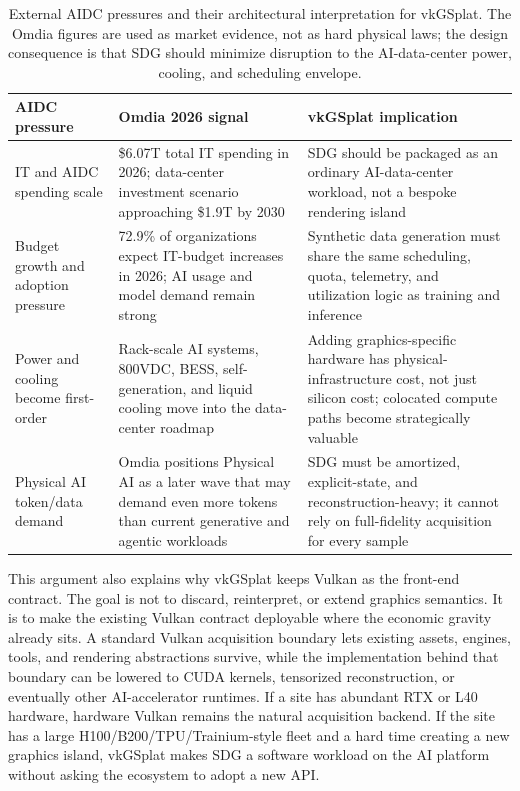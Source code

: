\documentclass[10pt,journal,onecolumn]{IEEEtran}
\begin{document}
\begin{table}[t]
\centering
\small
\caption{External AIDC pressures and their architectural interpretation for
vkGSplat. The Omdia figures are used as market evidence, not as hard physical
laws; the design consequence is that SDG should minimize disruption to the
AI-data-center power, cooling, and scheduling envelope.}
\label{tab:omdia-aidc-pressures}
\begin{tabular}{p{}p{}p{}}
\toprule
\textbf{AIDC pressure} & \textbf{Omdia 2026 signal} & \textbf{vkGSplat implication} \\
\midrule
IT and AIDC spending scale & \$6.07T total IT spending in 2026; data-center investment scenario approaching \$1.9T by 2030 & SDG should be packaged as an ordinary AI-data-center workload, not a bespoke rendering island \\
Budget growth and adoption pressure & 72.9\% of organizations expect IT-budget increases in 2026; AI usage and model demand remain strong & Synthetic data generation must share the same scheduling, quota, telemetry, and utilization logic as training and inference \\
Power and cooling become first-order & Rack-scale AI systems, 800VDC, BESS, self-generation, and liquid cooling move into the data-center roadmap & Adding graphics-specific hardware has physical-infrastructure cost, not just silicon cost; colocated compute paths become strategically valuable \\
Physical AI token/data demand & Omdia positions Physical AI as a later wave that may demand even more tokens than current generative and agentic workloads & SDG must be amortized, explicit-state, and reconstruction-heavy; it cannot rely on full-fidelity acquisition for every sample \\
\bottomrule
\end{tabular}
\end{table}

This argument also explains why vkGSplat keeps Vulkan as the front-end contract.
The goal is not to discard, reinterpret, or extend graphics semantics. It is to
make the existing Vulkan contract deployable where the economic gravity already
sits. A standard Vulkan acquisition boundary lets existing assets, engines,
tools, and rendering abstractions survive, while the implementation behind that
boundary can be lowered to CUDA kernels, tensorized reconstruction, or
eventually other AI-accelerator runtimes. If a site has abundant RTX or L40
hardware, hardware Vulkan remains the natural acquisition backend. If the site
has a large H100/B200/TPU/Trainium-style fleet and a hard time creating a new
graphics island, vkGSplat makes SDG a software workload on the AI platform
without asking the ecosystem to adopt a new API.
\end{document}
